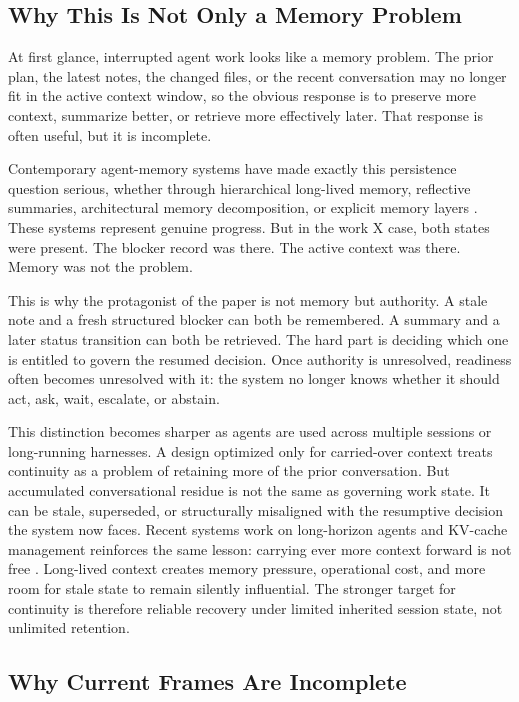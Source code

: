 \documentclass[a4paper,fleqn]{cas-dc}
\begin{document}
\subsection{Why This Is Not Only a Memory Problem}

At first glance, interrupted agent work looks like a memory problem. The prior plan, the latest notes, the changed files, or the recent conversation may no longer fit in the active context window, so the obvious response is to preserve more context, summarize better, or retrieve more effectively later. That response is often useful, but it is incomplete.

Contemporary agent-memory systems have made exactly this persistence question serious, whether through hierarchical long-lived memory, reflective summaries, architectural memory decomposition, or explicit memory layers \cite{Packer2023,Shinn2023,Sumers2023,ZhangMemory2024,Chhikara2025}. These systems represent genuine progress. But in the work X case, both states were present. The blocker record was there. The active context was there. Memory was not the problem.

This is why the protagonist of the paper is not memory but authority. A stale note and a fresh structured blocker can both be remembered. A summary and a later status transition can both be retrieved. The hard part is deciding which one is entitled to govern the resumed decision. Once authority is unresolved, readiness often becomes unresolved with it: the system no longer knows whether it should act, ask, wait, escalate, or abstain.

This distinction becomes sharper as agents are used across multiple sessions or long-running harnesses. A design optimized only for carried-over context treats continuity as a problem of retaining more of the prior conversation. But accumulated conversational residue is not the same as governing work state. It can be stale, superseded, or structurally misaligned with the resumptive decision the system now faces. Recent systems work on long-horizon agents and KV-cache management reinforces the same lesson: carrying ever more context forward is not free \cite{Wang2026,Wu2026}. Long-lived context creates memory pressure, operational cost, and more room for stale state to remain silently influential. The stronger target for continuity is therefore reliable recovery under limited inherited session state, not unlimited retention.

\subsection{Why Current Frames Are Incomplete}
\end{document}
